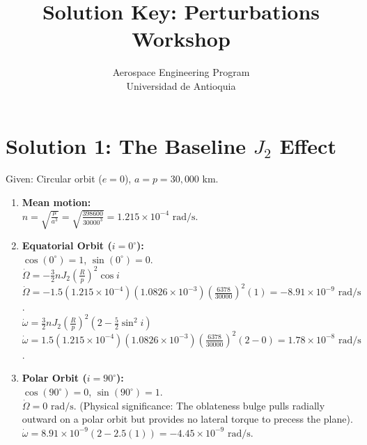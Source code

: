 \documentclass[12pt, letterpaper]{article}
\title{\textbf{Solution Key: Perturbations Workshop}}
\author{Aerospace Engineering Program \\ Universidad de Antioquia}
\date{}
\begin{document}
\maketitle

\section*{Solution 1: The Baseline $J_2$ Effect}
Given: Circular orbit ($e=0$), $a = p = 30,000$ km.
\begin{enumerate}
    \item[a)] \textbf{Mean motion:} \\
    $n = \sqrt{\frac{\mu}{a^3}} = \sqrt{\frac{398600}{30000^3}} = 1.215 \times 10^{-4} \text{ rad/s}$.
    
    \item[b)] \textbf{Equatorial Orbit ($i = 0^\circ$):} \\
    $\cos(0^\circ) = 1$, $\sin(0^\circ) = 0$. \\
    $\dot{\Omega} = -\frac{3}{2} n J_2 \left(\frac{R}{p}\right)^2 \cos i$ \\
    $\dot{\Omega} = -1.5 (1.215 \times 10^{-4})(1.0826 \times 10^{-3}) \left(\frac{6378}{30000}\right)^2 (1) = -8.91 \times 10^{-9} \text{ rad/s}$. \\
    $\dot{\omega} = \frac{3}{2} n J_2 \left(\frac{R}{p}\right)^2 \left(2 - \frac{5}{2}\sin^2 i\right)$ \\
    $\dot{\omega} = 1.5 (1.215 \times 10^{-4})(1.0826 \times 10^{-3}) \left(\frac{6378}{30000}\right)^2 (2 - 0) = 1.78 \times 10^{-8} \text{ rad/s}$.
    
    \item[c)] \textbf{Polar Orbit ($i = 90^\circ$):} \\
    $\cos(90^\circ) = 0$, $\sin(90^\circ) = 1$. \\
    $\dot{\Omega} = 0 \text{ rad/s}$. (Physical significance: The oblateness bulge pulls radially outward on a polar orbit but provides no lateral torque to precess the plane). \\
    $\dot{\omega} = 8.91 \times 10^{-9} \left(2 - 2.5(1)\right) = -4.45 \times 10^{-9} \text{ rad/s}$.
\end{enumerate}
\end{document}
